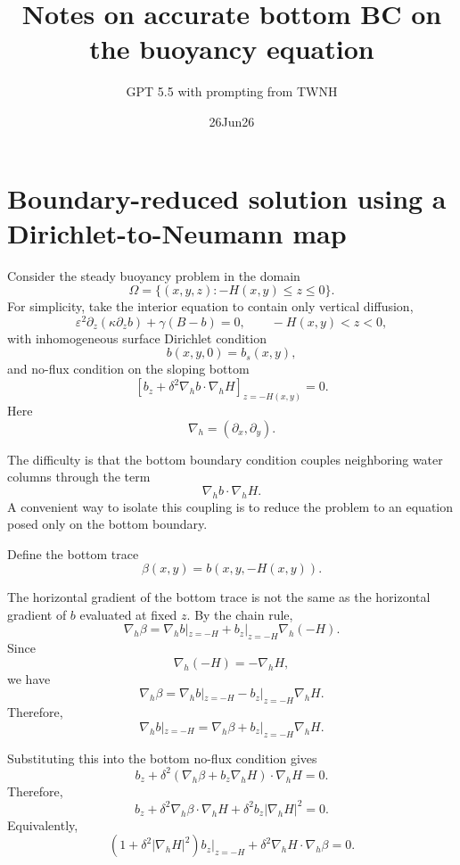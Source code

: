 \documentclass[11pt]{amsart}
\title{Notes on accurate bottom BC on the buoyancy equation}
\author{GPT 5.5 with  prompting from TWNH }
\date{26Jun26}                                           %
\begin{document}
\maketitle

\section{Boundary-reduced solution using a Dirichlet-to-Neumann map}

Consider the steady buoyancy problem in the domain
\[
\Omega=\{(x,y,z):-H(x,y)\le z\le 0\}.
\]
For simplicity, take the interior equation to contain only vertical diffusion,
\[
\varepsilon^2 \partial_z\left(\kappa \partial_z b\right)
+\gamma(B-b)=0,
\qquad -H(x,y)<z<0,
\]
with inhomogeneous surface Dirichlet condition
\[
b(x,y,0)=b_s(x,y),
\]
and no-flux condition on the sloping bottom
\[
\left[
b_z+\delta^2 \nabla_h b\cdot \nabla_h H
\right]_{z=-H(x,y)}=0.
\]
Here
\[
\nabla_h=(\partial_x,\partial_y).
\]

The difficulty is that the bottom boundary condition couples neighboring water columns through the term
\[
\nabla_h b\cdot \nabla_h H.
\]
A convenient way to isolate this coupling is to reduce the problem to an equation posed only on the bottom boundary.

Define the bottom trace
\[
\beta(x,y)=b(x,y,-H(x,y)).
\]

The horizontal gradient of the bottom trace is not the same as the horizontal gradient of \(b\) evaluated at fixed \(z\). By the chain rule,
\[
\nabla_h \beta
=
\nabla_h b|_{z=-H}
+
b_z|_{z=-H}\nabla_h(-H).
\]
Since
\[
\nabla_h(-H)=-\nabla_h H,
\]
we have
\[
\nabla_h \beta
=
\nabla_h b|_{z=-H}
-
b_z|_{z=-H}\nabla_h H.
\]
Therefore,
\[
\nabla_h b|_{z=-H}
=
\nabla_h \beta
+
b_z|_{z=-H}\nabla_h H.
\]

Substituting this into the bottom no-flux condition gives
\[
b_z+\delta^2
\left(
\nabla_h \beta
+
b_z\nabla_h H
\right)\cdot \nabla_h H=0.
\]
Therefore,
\[
b_z
+\delta^2 \nabla_h \beta\cdot \nabla_h H
+\delta^2 b_z |\nabla_h H|^2=0.
\]
Equivalently,
\[
\boxed{
\left(1+\delta^2 |\nabla_h H|^2\right)b_z|_{z=-H}
+
\delta^2 \nabla_h H\cdot \nabla_h \beta
=0.
}
\]
\end{document}
